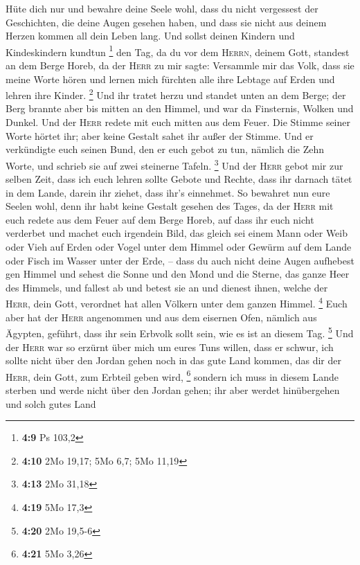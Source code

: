  Hüte dich nur und bewahre deine Seele wohl, dass du nicht
vergessest der Geschichten, die deine Augen gesehen haben, und dass sie
nicht aus deinem Herzen kommen all dein Leben lang. Und sollst deinen
Kindern und Kindeskindern kundtun \footnote{\textbf{4:9} Ps 103,2}
 den Tag, da du vor dem \textsc{Herrn}, deinem Gott,
standest an dem Berge Horeb, da der \textsc{Herr} zu mir sagte:
Versammle mir das Volk, dass sie meine Worte hören und lernen mich
fürchten alle ihre Lebtage auf Erden und lehren ihre Kinder. \footnote{\textbf{4:10}
  2Mo 19,17; 5Mo 6,7; 5Mo 11,19}  Und ihr tratet herzu
und standet unten an dem Berge; der Berg brannte aber bis mitten an den
Himmel, und war da Finsternis, Wolken und Dunkel.  Und
der \textsc{Herr} redete mit euch mitten aus dem Feuer. Die Stimme
seiner Worte hörtet ihr; aber keine Gestalt sahet ihr außer der Stimme.
 Und er verkündigte euch seinen Bund, den er euch gebot
zu tun, nämlich die Zehn Worte, und schrieb sie auf zwei steinerne
Tafeln. \footnote{\textbf{4:13} 2Mo 31,18}  Und der
\textsc{Herr} gebot mir zur selben Zeit, dass ich euch lehren sollte
Gebote und Rechte, dass ihr darnach tätet in dem Lande, darein ihr
ziehet, dass ihr's einnehmet.  So bewahret nun eure
Seelen wohl, denn ihr habt keine Gestalt gesehen des Tages, da der
\textsc{Herr} mit euch redete aus dem Feuer auf dem Berge Horeb,
 auf dass ihr euch nicht verderbet und machet euch
irgendein Bild, das gleich sei einem Mann oder Weib  oder
Vieh auf Erden oder Vogel unter dem Himmel  oder Gewürm
auf dem Lande oder Fisch im Wasser unter der Erde, -- 
dass du auch nicht deine Augen aufhebest gen Himmel und sehest die Sonne
und den Mond und die Sterne, das ganze Heer des Himmels, und fallest ab
und betest sie an und dienest ihnen, welche der \textsc{Herr}, dein
Gott, verordnet hat allen Völkern unter dem ganzen Himmel. \footnote{\textbf{4:19}
  5Mo 17,3}  Euch aber hat der \textsc{Herr} angenommen
und aus dem eisernen Ofen, nämlich aus Ägypten, geführt, dass ihr sein
Erbvolk sollt sein, wie es ist an diesem Tag. \footnote{\textbf{4:20}
  2Mo 19,5-6}  Und der \textsc{Herr} war so erzürnt über
mich um eures Tuns willen, dass er schwur, ich sollte nicht über den
Jordan gehen noch in das gute Land kommen, das dir der \textsc{Herr},
dein Gott, zum Erbteil geben wird, \footnote{\textbf{4:21} 5Mo 3,26}
 sondern ich muss in diesem Lande sterben und werde nicht
über den Jordan gehen; ihr aber werdet hinübergehen und solch gutes Land
